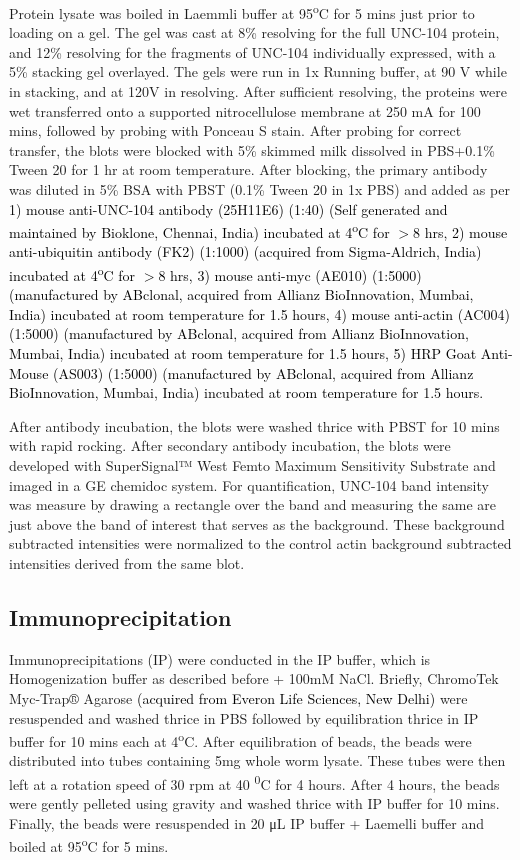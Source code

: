 Protein lysate was boiled in Laemmli buffer at 95\textsuperscript{o}C for 5 mins just prior to loading on a gel. The gel was cast at 8\% resolving for the full UNC-104 protein, and 12\% resolving for the fragments of UNC-104 individually expressed, with a 5\% stacking gel overlayed. The gels were run in 1x Running buffer, at 90 V while in stacking, and at 120V in resolving. After sufficient resolving, the proteins were wet transferred onto a supported nitrocellulose membrane at 250 mA for 100 mins, followed by probing with Ponceau S stain. After probing for correct transfer, the blots were blocked with 5\% skimmed milk dissolved in PBS+0.1\% Tween 20 for 1 hr at room temperature. After blocking, the primary antibody was diluted in 5\% BSA with PBST (0.1\% Tween 20 in 1x PBS) and added as per \textcolor{black}{1) mouse anti-UNC-104 antibody (25H11E6) (1:40) (Self generated and maintained by Bioklone, Chennai, India) incubated at 4\textsuperscript{o}C for $>$8 hrs, 2) mouse anti-ubiquitin antibody (FK2) (1:1000) (acquired from Sigma-Aldrich, India) incubated  at 4\textsuperscript{o}C for $>$8 hrs, 3) mouse anti-myc (AE010) (1:5000) (manufactured by ABclonal, acquired from Allianz BioInnovation, Mumbai, India) incubated at room temperature for 1.5 hours, 4) mouse anti-actin (AC004) (1:5000) (manufactured by ABclonal, acquired from Allianz BioInnovation, Mumbai, India) incubated at room temperature for 1.5 hours, 5) HRP Goat Anti-Mouse (AS003) (1:5000) (manufactured by ABclonal, acquired from Allianz BioInnovation, Mumbai, India) incubated at room temperature for 1.5 hours.}

After antibody incubation, the blots were washed thrice with PBST for 10 mins with rapid rocking. After secondary antibody incubation, the blots were developed with SuperSignal™ West Femto Maximum Sensitivity Substrate and imaged in a GE chemidoc system. For quantification, UNC-104 band intensity was measure by drawing a rectangle over the band and measuring the same are just above the band of interest that serves as the background. These background subtracted intensities were normalized to the control actin background subtracted intensities derived from the same blot.

\subsection{Immunoprecipitation}

Immunoprecipitations (IP) were conducted in the IP buffer, which is Homogenization buffer as described before + 100mM NaCl. Briefly, ChromoTek Myc-Trap® Agarose \textcolor{black}{(acquired from Everon Life Sciences, New Delhi)} were resuspended and washed thrice in PBS followed by equilibration thrice in IP buffer for 10 mins each at 4\textsuperscript{o}C. After equilibration of beads, the beads were distributed into tubes containing 5mg whole worm lysate. These tubes were then left at a rotation speed of 30 rpm at 40 \textsuperscript{0}C for 4 hours. After 4 hours, the beads were gently pelleted using gravity and washed thrice with IP buffer for 10 mins. Finally, the beads were resuspended in 20 μL IP buffer + Laemelli buffer and boiled at 95\textsuperscript{o}C for 5 mins.

